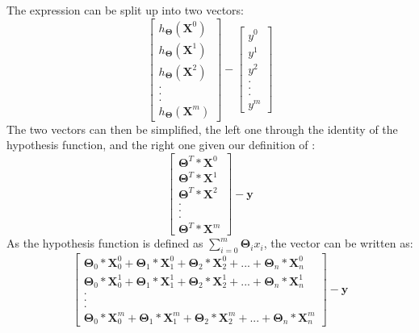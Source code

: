 \documentclass[a4paper,12pt]{article}
\begin{document}
The expression can be split up into two vectors: 
\[\begin{bmatrix} h_{\boldsymbol{\Theta}} (\boldsymbol{X}^0) \\ h_{\boldsymbol{\Theta}} (\boldsymbol{X}^1) \\ h_{\boldsymbol{\Theta}} (\boldsymbol{X}^2) \\ . \\ . \\ . \\ h_{\boldsymbol{\Theta}} (\boldsymbol{X}^m) \end{bmatrix} - \begin{bmatrix} y^0 \\ y^1 \\ y^2 \\ . \\ . \\ . \\ y^m \end{bmatrix}\]
The two vectors can then be simplified, the left one through the identity of the hypothesis function, and the right one given our definition of \unboldmath:
\[\begin{bmatrix} \boldsymbol{\Theta}^T * \boldsymbol{X}^0 \\ \boldsymbol{\Theta}^T * \boldsymbol{X}^1 \\ \boldsymbol{\Theta}^T * \boldsymbol{X}^2 \\ . \\ . \\ . \\ \boldsymbol{\Theta}^T * \boldsymbol{X}^m \end{bmatrix} - \boldsymbol{y}\]
As the hypothesis function is defined as \(\sum_{i=0}^m \boldsymbol{\Theta}_i x_i\), the vector can be written as:
\[\begin{bmatrix} \boldsymbol{\Theta}_0 * \boldsymbol{X}_0^0 + \boldsymbol{\Theta}_1 * \boldsymbol{X}_1^0 + \boldsymbol{\Theta}_2 * \boldsymbol{X}_2^0 + ... + \boldsymbol{\Theta}_n * \boldsymbol{X}_n^0 \\ \boldsymbol{\Theta}_0 * \boldsymbol{X}_0^1 + \boldsymbol{\Theta}_1 * \boldsymbol{X}_1^1 + \boldsymbol{\Theta}_2 * \boldsymbol{X}_2^1 + ... + \boldsymbol{\Theta}_n * \boldsymbol{X}_n^1 \\ . \\ . \\ . \\ \boldsymbol{\Theta}_0 * \boldsymbol{X}_0^m + \boldsymbol{\Theta}_1 * \boldsymbol{X}_1^m + \boldsymbol{\Theta}_2 * \boldsymbol{X}_2^m + ... + \boldsymbol{\Theta}_n * \boldsymbol{X}_n^m \end{bmatrix} - \boldsymbol{y}\]
\end{document}
